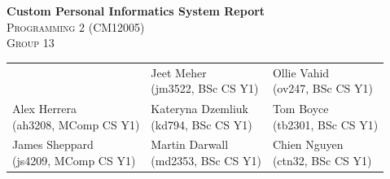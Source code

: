 \documentclass[12pt]{article}
\begin{document}
\begin{titlepage}
    \centering
    {\Huge \bfseries Custom Personal Informatics System Report}\\[30pt]

    \large \textsc{Programming 2 (CM12005)\\ Group 13}\\[30pt]

    \begin{tabular}{>{\centering}m{} >{\centering}m{} >{\centering\arraybackslash}m{}}

        {\large Akim Komarnitskii \newline {\small (ak3625, BSc CS Y1)}} &
        {\large Jeet Meher \newline {\small (jm3522, BSc CS Y1)}} &
        {\large Ollie Vahid \newline {\small(ov247, BSc CS Y1)}} \\

        [0.75cm]

        {\large Alex Herrera \newline \small (ah3208, MComp CS Y1)} &
        {\large Kateryna Dzemliuk \newline \small (kd794, BSc CS Y1)} &
        {\large Tom Boyce \newline \small (tb2301, BSc CS Y1)} \\

        [0.75cm]

        {\large James Sheppard \newline \small (js4209, MComp CS Y1)} &
        {\large Martin Darwall \newline \small (md2353, BSc CS Y1)} &
        {\large Chien Nguyen \newline \small (ctn32, BSc CS Y1)} \\

    \end{tabular}

    \vfill

    \begin{minipage}{0.8\textwidth}


\end{minipage}
\end{titlepage}
\end{document}
